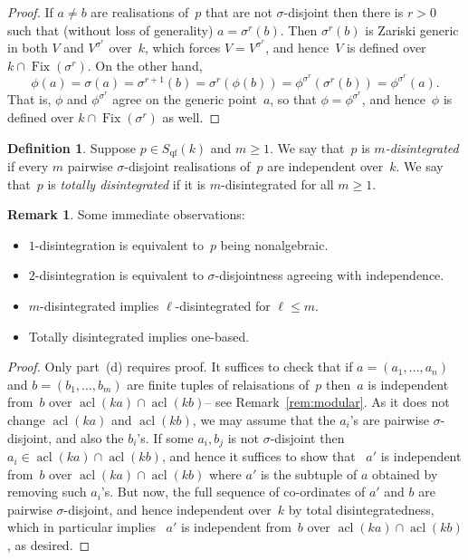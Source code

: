 \documentclass[\DocOpts]{amsart}
\theoremstyle{definition}
\newtheorem{remark}[theorem]{Remark}
\newtheorem{definition}[theorem]{Definition}
\def\fix{\operatorname{Fix}}
\def\qf{\operatorname{qf}}
\def\acl{\operatorname{acl}}
\newcommand{\<}{\langle}
\renewcommand{\>}{\rangle}
\begin{document}
\begin{proof}
If $a\neq b$ are realisations of~$p$ that are not $\sigma$-disjoint then there is $r>0$ such that (without loss of generality) $a=\sigma^r(b)$.
Then $\sigma^r(b)$ is Zariski generic in both $V$ and $V^{\sigma^r}$ over~$k$, which forces $V=V^{\sigma^r}$, and hence~$V$ is defined over $k\cap\fix(\sigma^r)$.
On the other hand,
$$\phi(a)=\sigma(a)=\sigma^{r+1}(b)=\sigma^r(\phi(b))=\phi^{\sigma^r}(\sigma^r(b))=\phi^{\sigma^r}(a).$$
That is, $\phi$ and $\phi^{\sigma^r}$ agree on the generic point~$a$, so that $\phi=\phi^{\sigma^r}$, and hence~$\phi$ is defined over $k\cap\fix(\sigma^r)$ as well.
\end{proof}


\begin{definition}
Suppose $p\in S_{\qf}(k)$ and $m\geq 1$.
We say that~$p$ is {\em $m$-disintegrated} if every $m$ pairwise $\sigma$-disjoint realisations of~$p$ are independent over~$k$.
We say that~$p$ is {\em totally disintegrated} if it is $m$-disintegrated for all $m\geq 1$.
\end{definition}

\begin{remark}
\label{rem:disint}
Some immediate observations:
\begin{itemize}
\item[(a)]
$1$-disintegration is equivalent to~$p$ being nonalgebraic.
\item[(b)]
$2$-disintegration is equivalent to $\sigma$-disjointness agreeing with independence.
\item[(c)]
$m$-disintegrated implies $\ell$-disintegrated for $\ell\leq m$.
\item[(d)]
Totally disintegrated implies one-based.
\end{itemize}
\end{remark}

\begin{proof}
Only part~(d) requires proof.
It suffices to check that if $a=(a_1,\dots, a_n)$ and $b=(b_1,\dots, b_m)$ are finite tuples of relaisations of~$p$ then~\(a\) is independent from~\(b\) over \(\acl(ka)\cap\acl(kb)\)-- see Remark~\ref{rem:modular}.
As it does not change $\acl(ka)$ and $\acl(kb)$, we may assume that the $a_i$'s are pairwise $\sigma$-disjoint, and also the $b_i$'s.
If some $a_i,b_j$ is not $\sigma$-disjoint then $a_i\in \acl(ka)\cap\acl(kb)$, and hence it suffices to show that ~\(a'\) is independent from~\(b\) over \(\acl(ka)\cap\acl(kb)\) where $a'$ is the subtuple of $a$ obtained by removing such $a_i$'s.
But now, the full sequence of co-ordinates of $a'$ and $b$ are pairwise $\sigma$-disjoint, and hence independent over~$k$ by total disintegratedness, which in particular implies ~\(a'\) is independent from~\(b\) over \(\acl(ka)\cap\acl(kb)\), as desired.
\end{proof}
\end{document}
